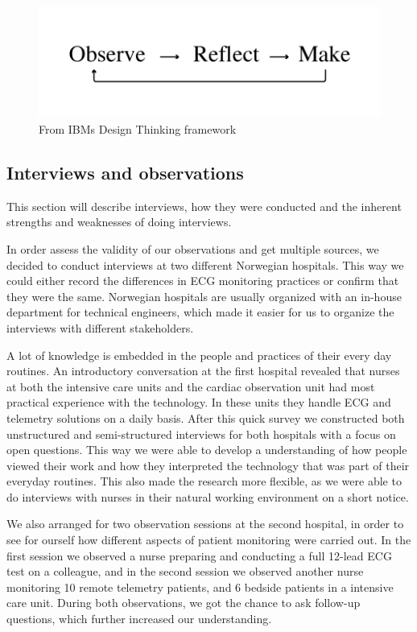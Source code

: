 \begin{figure}[H]
\centering
\includegraphics[scale=0.6]{img/figures/designThinking.png}
\caption{From IBMs Design Thinking framework}
\label{fig:ibmDesignThinking}
\end{figure}

\subsection{Interviews and observations} %
\label{sub:interviews}

This section will describe interviews, how they were conducted and the inherent strengths and weaknesses of doing interviews.

In order assess the validity of our observations and get multiple sources, we decided to conduct interviews at two different Norwegian hospitals. This way we could either record the differences in ECG monitoring practices or confirm that they were the same. Norwegian hospitals are usually organized with an in-house department for technical engineers, which made it easier for us to organize the interviews with different stakeholders.

A lot of knowledge is embedded in the people and practices of their every day routines. An introductory conversation at the first hospital revealed that nurses at both the intensive care units and the cardiac observation unit had most practical experience with the technology. In these units they handle ECG and telemetry solutions on a daily basis. After this quick survey we constructed both unstructured and semi-structured interviews for both hospitals with a focus on open questions. This way we were able to develop a understanding of how people viewed their work and how they interpreted the technology that was part of their everyday routines. This also made the research more flexible, as we were able to do interviews with nurses in their natural working environment on a short notice.

We also arranged for two observation sessions at the second hospital, in order to see for ourself how different aspects of patient monitoring were carried out. In the first session we observed a nurse preparing and conducting a full 12-lead ECG test on a colleague, and in the second session we observed another nurse monitoring 10 remote telemetry patients, and 6 bedside patients in a intensive care unit. During both observations, we got the chance to ask follow-up questions, which further increased our understanding.

